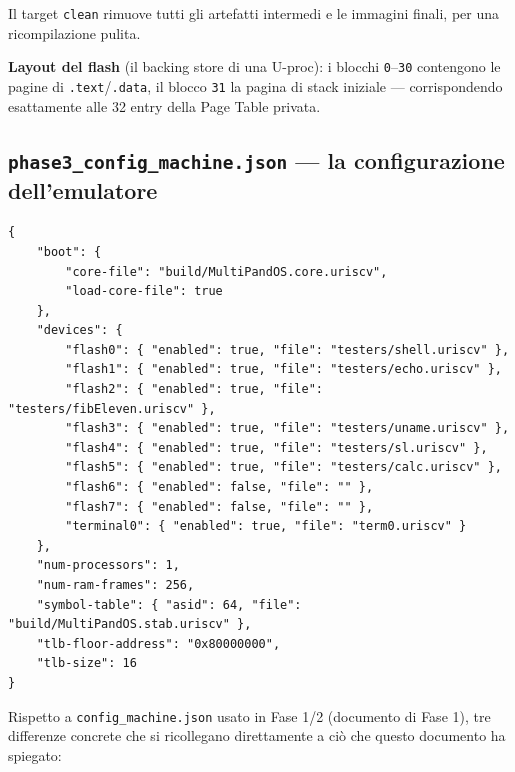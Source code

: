 \documentclass[11pt,a4paper]{article}
\newcommand{\code}[1]{\texttt{#1}}
\begin{document}
Il target \code{clean} rimuove tutti gli artefatti intermedi e le immagini
finali, per una ricompilazione pulita.

\textbf{Layout del flash} (il backing store di una U-proc): i blocchi
\code{0}--\code{30} contengono le pagine di \code{.text}/\code{.data}, il
blocco \code{31} la pagina di stack iniziale --- corrispondendo esattamente
alle 32 entry della Page Table privata.

\subsection{\code{phase3\_config\_machine.json} --- la configurazione dell'emulatore}
\begin{lstlisting}
{
    "boot": {
        "core-file": "build/MultiPandOS.core.uriscv",
        "load-core-file": true
    },
    "devices": {
        "flash0": { "enabled": true, "file": "testers/shell.uriscv" },
        "flash1": { "enabled": true, "file": "testers/echo.uriscv" },
        "flash2": { "enabled": true, "file": "testers/fibEleven.uriscv" },
        "flash3": { "enabled": true, "file": "testers/uname.uriscv" },
        "flash4": { "enabled": true, "file": "testers/sl.uriscv" },
        "flash5": { "enabled": true, "file": "testers/calc.uriscv" },
        "flash6": { "enabled": false, "file": "" },
        "flash7": { "enabled": false, "file": "" },
        "terminal0": { "enabled": true, "file": "term0.uriscv" }
    },
    "num-processors": 1,
    "num-ram-frames": 256,
    "symbol-table": { "asid": 64, "file": "build/MultiPandOS.stab.uriscv" },
    "tlb-floor-address": "0x80000000",
    "tlb-size": 16
}
\end{lstlisting}
Rispetto a \code{config\_machine.json} usato in Fase 1/2 (documento di Fase
1), tre differenze concrete che si ricollegano direttamente a ciò che
questo documento ha spiegato:
\end{document}
